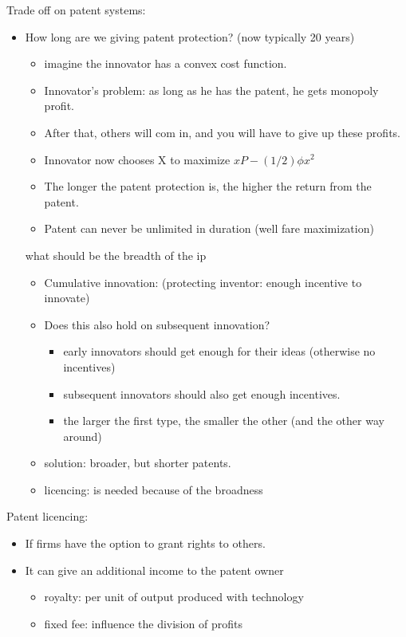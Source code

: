 \documentclass[12pt, a4paper, titlepage]{extarticle}
\begin{document}
Trade off on patent systems:
\begin{itemize}
    \item How long are we giving patent protection? (now typically 20 years)
    \begin{itemize}
        \item imagine the innovator has a convex cost function.
        \item Innovator's problem: as long as he has the patent, he gets monopoly profit.
        \item After that, others will com in, and you will have to give up these profits. 
        \item Innovator now chooses X to maximize $xP - (1/2)\phi x^2$ 
        \item The longer the patent protection is, the higher the return from the patent.
        \item Patent can never be unlimited in duration (well fare maximization)
    \end{itemize}
    what should be the breadth of the ip
    \begin{itemize}
        \item Cumulative innovation: (protecting inventor: enough incentive to innovate)
        \item Does this also hold on subsequent innovation?
        \begin{itemize}
            \item early innovators should get enough for their ideas (otherwise no incentives) 
            \item subsequent innovators should also get enough incentives. 
            \item the larger the first type, the smaller the other (and the other way around)
        \end{itemize}
        \item solution: broader, but shorter patents.
        \item licencing: is needed because of the broadness
    \end{itemize}
\end{itemize}

Patent licencing:
\begin{itemize}
    \item If firms have the option to grant rights to others.
    \item It can give an  additional income to the patent owner
    \begin{itemize}
        \item royalty: per unit of output produced with technology
        \item fixed fee: influence the division of profits
    \end{itemize}
\end{itemize}
\end{document}
